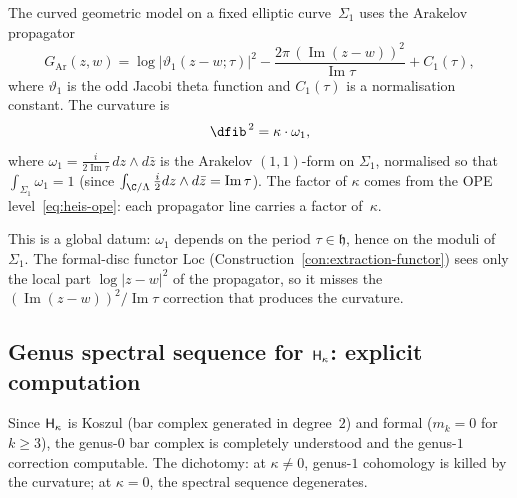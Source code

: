 \begin{verification}
\label{ver:heis-curvature}
The curved geometric model on a fixed elliptic
curve~$\Sigma_1$ uses the Arakelov propagator
\[
 G_{\mathrm{Ar}}(z,w)
 = \log\bigl|\vartheta_1(z - w; \tau)\bigr|^2
 - \frac{2\pi\, (\operatorname{Im}(z-w))^2}{\operatorname{Im} \tau}
 + C_1(\tau),
\]
where $\vartheta_1$ is the odd Jacobi theta function and
$C_1(\tau)$ is a normalisation constant. The curvature is
\[
 \dfib^{\,2}
 = \kappa \cdot \omega_1,
\]
where $\omega_1 = \frac{i}{2\operatorname{Im}\tau}\,
dz \wedge d\bar{z}$
is the Arakelov $(1,1)$-form on $\Sigma_1$, normalised so that
$\int_{\Sigma_1} \omega_1 = 1$
(since $\int_{\C/\Lambda} \frac{i}{2} dz \wedge d\bar{z}
= \operatorname{Im}\tau$). The factor of $\kappa$ comes
from the OPE level~\eqref{eq:heis-ope}: each propagator line
carries a factor of~$\kappa$.

This is a global datum: $\omega_1$ depends on the period
$\tau \in \mathfrak{h}$, hence on the moduli of~$\Sigma_1$.
The formal-disc functor $\mathrm{Loc}$
(Construction~\ref{con:extraction-functor}) sees only the local
part $\log|z-w|^2$ of the propagator, so it misses the
$(\operatorname{Im}(z-w))^2/\operatorname{Im}\tau$ correction
that produces the curvature.
\end{verification}


\subsection{Genus spectral sequence for $\mathsf{H}_\kappa$: explicit computation}
\label{subsec:heisenberg-spectral-sequence}

\providecommand{\Deltacyc}{\Delta_{\mathrm{cyc}}}

Since $\mathsf{H}_\kappa$ is Koszul (bar complex generated in degree~$2$) and
formal ($m_k = 0$ for $k \ge 3$), the genus-$0$ bar complex is completely understood and the genus-$1$ correction computable. The dichotomy: at $\kappa \neq 0$, genus-$1$ cohomology is killed by the curvature; at $\kappa = 0$, the spectral sequence degenerates.

